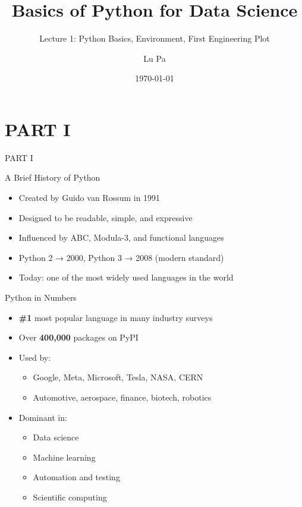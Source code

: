 \documentclass[aspectratio=169]{beamer}
\title{Basics of Python for Data Science}
\subtitle{Lecture 1: Python Basics, Environment, First Engineering Plot}
\author{Lu Pa}
\date{\today}
\begin{document}
\begin{frame}
  \titlepage
\end{frame}

\section{PART I}
\begin{frame}[plain]
  \begin{center}
    \vspace{2cm}
    {\color{white}\Huge PART I}
  \end{center}
\end{frame}

\begin{frame}{A Brief History of Python}
  \begin{itemize}
    \item Created by Guido van Rossum in 1991
    \item Designed to be readable, simple, and expressive
    \item Influenced by ABC, Modula-3, and functional languages
    \item Python 2 → 2000, Python 3 → 2008 (modern standard)
    \item Today: one of the most widely used languages in the world
  \end{itemize}
\end{frame}

\begin{frame}{Python in Numbers}
  \begin{itemize}
    \item \textbf{\#1} most popular language in many industry surveys
    \item Over \textbf{400,000} packages on PyPI
    \item Used by:
      \begin{itemize}
        \item Google, Meta, Microsoft, Tesla, NASA, CERN
        \item Automotive, aerospace, finance, biotech, robotics
      \end{itemize}
    \item Dominant in:
      \begin{itemize}
        \item Data science
        \item Machine learning
        \item Automation and testing
        \item Scientific computing
      \end{itemize}
  \end{itemize}
\end{frame}
\end{document}
